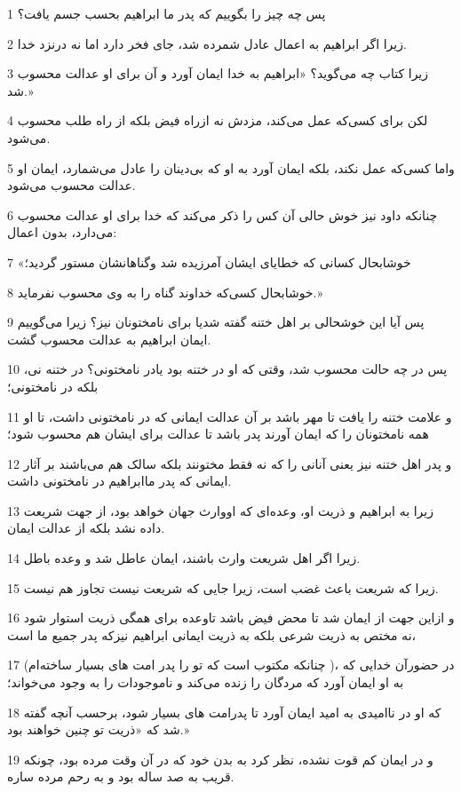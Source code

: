 \par 1 پس چه چیز را بگوییم که پدر ما ابراهیم بحسب جسم یافت؟
\par 2 زیرا اگر ابراهیم به اعمال عادل شمرده شد، جای فخر دارد اما نه درنزد خدا.
\par 3 زیرا کتاب چه می‌گوید؟ «ابراهیم به خدا ایمان آورد و آن برای او عدالت محسوب شد.»
\par 4 لکن برای کسی‌که عمل می‌کند، مزدش نه ازراه فیض بلکه از راه طلب محسوب می‌شود.
\par 5 واما کسی‌که عمل نکند، بلکه ایمان آورد به او که بی‌دینان را عادل می‌شمارد، ایمان او عدالت محسوب می‌شود.
\par 6 چنانکه داود نیز خوش حالی آن کس را ذکر می‌کند که خدا برای او عدالت محسوب می‌دارد، بدون اعمال:
\par 7 «خوشابحال کسانی که خطایای ایشان آمرزیده شد وگناهانشان مستور گردید؛
\par 8 خوشابحال کسی‌که خداوند گناه را به وی محسوب نفرماید.»
\par 9 پس آیا این خوشحالی بر اهل ختنه گفته شدیا برای نامختونان نیز؟ زیرا می‌گوییم ایمان ابراهیم به عدالت محسوب گشت.
\par 10 پس در چه حالت محسوب شد، وقتی که او در ختنه بود یادر نامختونی؟ در ختنه نی، بلکه در نامختونی؛
\par 11 و علامت ختنه را یافت تا مهر باشد بر آن عدالت ایمانی که در نامختونی داشت، تا او همه نامختونان را که ایمان آورند پدر باشد تا عدالت برای ایشان هم محسوب شود؛
\par 12 و پدر اهل ختنه نیز یعنی آنانی را که نه فقط مختونند بلکه سالک هم می‌باشند بر آثار ایمانی که پدر ماابراهیم در نامختونی داشت.
\par 13 زیرا به ابراهیم و ذریت او، وعده‌ای که اووارث جهان خواهد بود، از جهت شریعت داده نشد بلکه از عدالت ایمان.
\par 14 زیرا اگر اهل شریعت وارث باشند، ایمان عاطل شد و وعده باطل.
\par 15 زیرا که شریعت باعث غضب است، زیرا جایی که شریعت نیست تجاوز هم نیست.
\par 16 و ازاین جهت از ایمان شد تا محض فیض باشد تاوعده برای همگی ذریت استوار شود نه مختص به ذریت شرعی بلکه به ذریت ایمانی ابراهیم نیزکه پدر جمیع ما است،
\par 17 (چنانکه مکتوب است که تو را پدر امت های بسیار ساخته‌ام )، در حضورآن خدایی که به او ایمان آورد که مردگان را زنده می‌کند و ناموجودات را به وجود می‌خواند؛
\par 18 که او در ناامیدی به امید ایمان آورد تا پدرامت های بسیار شود، برحسب آنچه گفته شد که «ذریت تو چنین خواهند بود.»
\par 19 و در ایمان کم قوت نشده، نظر کرد به بدن خود که در آن وقت مرده بود، چونکه قریب به صد ساله بود و به رحم مرده ساره.
